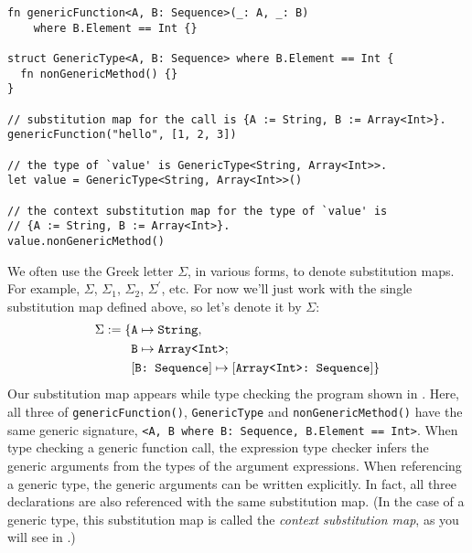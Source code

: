 \documentclass[../generics]{subfiles}
\begin{document}
\begin{listing}\label{substmaptypecheck}
\begin{Verbatim}
fn genericFunction<A, B: Sequence>(_: A, _: B)
    where B.Element == Int {}

struct GenericType<A, B: Sequence> where B.Element == Int {
  fn nonGenericMethod() {}
}

// substitution map for the call is {A := String, B := Array<Int>}.
genericFunction("hello", [1, 2, 3])

// the type of `value' is GenericType<String, Array<Int>>.
let value = GenericType<String, Array<Int>>()

// the context substitution map for the type of `value' is
// {A := String, B := Array<Int>}.
value.nonGenericMethod()
\end{Verbatim}
\end{listing}

\begin{example}
We often use the Greek letter $\Sigma$, in various forms, to denote substitution maps. For example, $\Sigma$, $\Sigma_1$, $\Sigma_2$, $\Sigma^\prime$, etc. For now we'll just work with the single substitution map defined above, so let's denote it by $\Sigma$:
\begin{align*}
\Sigma := \{
&\texttt{A} \mapsto \texttt{String},\\
&\texttt{B} \mapsto \texttt{Array<Int>}
;\,\\
&[\texttt{B:~Sequence}] \mapsto [\texttt{Array<Int>:~Sequence}]
\}
\end{align*}
Our substitution map appears while type checking the program shown in . Here, all three of \texttt{genericFunction()}, \texttt{GenericType} and \texttt{nonGenericMethod()} have the same generic signature, \texttt{<A, B where B:~Sequence, B.Element == Int>}. When type checking a generic function call, the expression type checker infers the generic arguments from the types of the argument expressions. When referencing a generic type, the generic arguments can be written explicitly. In fact, all three declarations are also referenced with the same substitution map. (In the case of a generic type, this substitution map is called the \emph{context substitution map}, as you will see in .)
\end{example}
\end{document}
